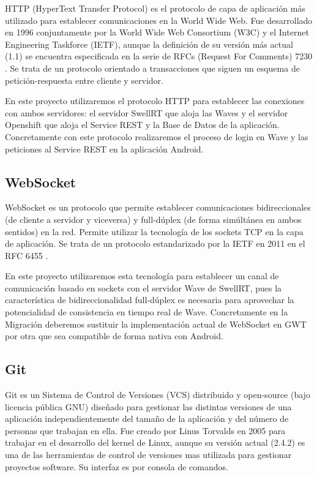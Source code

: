	HTTP \cite{ref:http} (HyperText Transfer Protocol) es el protocolo de capa de aplicación más utilizado para establecer comunicaciones en la World Wide Web. Fue desarrollado en 1996 conjuntamente por la World Wide Web Consortium (W3C) y el Internet Engineering Taskforce (IETF), aunque la definición de su versión más actual (1.1) se encuentra especificada en la serie de RFCs (Request For Comments) 7230 \cite{ref:http}. Se trata de un protocolo orientado a transacciones que siguen un esquema de petición-respuesta entre cliente y servidor. 
	
	En este proyecto utilizaremos el protocolo HTTP para establecer las conexiones con ambos servidores: el servidor SwellRT que aloja las Waves y el servidor Openshift que aloja el Service REST y la Base de Datos de la aplicación. Concretamente con este protocolo realizaremos el proceso de login en Wave y las peticiones al Service REST en la aplicación Android.
    
    \subsection{WebSocket}\label{ssec:websocket}
    
	WebSocket \cite{ref:webSocket_ref} es un protocolo que permite establecer comunicaciones bidireccionales (de cliente a servidor y viceversa) y full-dúplex (de forma simúltánea en ambos sentidos) en la red. Permite utilizar la tecnología de los sockets TCP en la capa de aplicación.  Se trata de un protocolo estandarizado por la IETF en 2011 en el RFC 6455 \cite{ref:webSocket_ref}. 
	
	En este proyecto utilizaremos esta tecnología para establecer un canal de comunicación basado en sockets con el servidor Wave de SwellRT, pues la característica de bidireccionalidad full-dúplex es necesaria para aprovechar la potencialidad de consistencia en tiempo real de Wave. Concretamente en la Migración deberemos sustituir la implementación actual de WebSocket en GWT por otra que sea compatible de forma nativa con Android.
    
    \subsection{Git}\label{ssec:git} 
    
	Git \cite{ref:git} es un Sistema de Control de Versiones (VCS) distribuido y open-source (bajo licencia pública GNU) diseñado para gestionar las distintas versiones de una aplicación independientemente del tamaño de la aplicación y del número de personas que trabajan en ella. Fue creado por Linus Torvalds en 2005 para trabajar en el desarrollo del kernel de Linux, aunque  su versión actual (2.4.2) es una de las herramientas  de control de versiones mas utilizada para gestionar proyectos software. Su interfaz es por consola de comandos.
	
